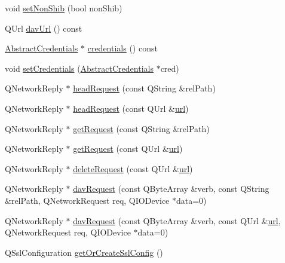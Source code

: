 \begin{DoxyCompactItemize}
void \hyperlink{class_o_c_c_1_1_account_a38c33b5d56b774a43fbb14ab9f4589b2}{set\+Non\+Shib} (bool non\+Shib)
\item 
Q\+Url \hyperlink{class_o_c_c_1_1_account_a3e72ac7ea67c0029080f31672efe1b88}{dav\+Url} () const
\item 
\hyperlink{class_o_c_c_1_1_abstract_credentials}{Abstract\+Credentials} $\ast$ \hyperlink{class_o_c_c_1_1_account_aead250da94c2a743e702268f60a6e781}{credentials} () const
\item 
void \hyperlink{class_o_c_c_1_1_account_a254e7934695817014f81b6374a49bad5}{set\+Credentials} (\hyperlink{class_o_c_c_1_1_abstract_credentials}{Abstract\+Credentials} $\ast$cred)
\item 
Q\+Network\+Reply $\ast$ \hyperlink{class_o_c_c_1_1_account_aa7acb02216f5cc5d8d9057ab29b17fe4}{head\+Request} (const Q\+String \&rel\+Path)
\item 
Q\+Network\+Reply $\ast$ \hyperlink{class_o_c_c_1_1_account_acc5eabb1b75e96f17046c1d93e3ac874}{head\+Request} (const Q\+Url \&\hyperlink{class_o_c_c_1_1_account_a8aa1b92581de450a356a51ad8760d1f1}{url})
\item 
Q\+Network\+Reply $\ast$ \hyperlink{class_o_c_c_1_1_account_a6fb969819f685c52d74cbc00d463dd64}{get\+Request} (const Q\+String \&rel\+Path)
\item 
Q\+Network\+Reply $\ast$ \hyperlink{class_o_c_c_1_1_account_ac863fdcaaf178a8546fb93261ce120de}{get\+Request} (const Q\+Url \&\hyperlink{class_o_c_c_1_1_account_a8aa1b92581de450a356a51ad8760d1f1}{url})
\item 
Q\+Network\+Reply $\ast$ \hyperlink{class_o_c_c_1_1_account_a781f430797c6f2236c787cf3e3a6baa2}{delete\+Request} (const Q\+Url \&\hyperlink{class_o_c_c_1_1_account_a8aa1b92581de450a356a51ad8760d1f1}{url})
\item 
Q\+Network\+Reply $\ast$ \hyperlink{class_o_c_c_1_1_account_ab4e665df93173f822399b7987d394596}{dav\+Request} (const Q\+Byte\+Array \&verb, const Q\+String \&rel\+Path, Q\+Network\+Request req, Q\+I\+O\+Device $\ast$data=0)
\item 
Q\+Network\+Reply $\ast$ \hyperlink{class_o_c_c_1_1_account_a8a1446779c4118c988420a66790aa569}{dav\+Request} (const Q\+Byte\+Array \&verb, const Q\+Url \&\hyperlink{class_o_c_c_1_1_account_a8aa1b92581de450a356a51ad8760d1f1}{url}, Q\+Network\+Request req, Q\+I\+O\+Device $\ast$data=0)
\item 
Q\+Ssl\+Configuration \hyperlink{class_o_c_c_1_1_account_ae8a4dddc3d6d2be239615d4eb9a3a668}{get\+Or\+Create\+Ssl\+Config} ()
\item 

\end{DoxyCompactItemize}
